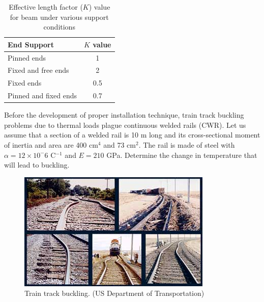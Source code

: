 \documentclass[
10pt,
a4paper,
openany,
svgnames,
]{book}
\begin{document}
\begin{table}[h]
  \centering
  \caption{Effective length factor ($K$) value for beam under various support conditions}
  {\renewcommand{\arraystretch}{1.2}
  \begin{tabular}{ lc }
    \toprule
    End Support & $K$ value \\
    \midrule
    Pinned ends & 1 \\
    Fixed and free ends & 2 \\
    Fixed ends & 0.5 \\
    Pinned and fixed ends & 0.7 \\
    \bottomrule
  \end{tabular}}
\end{table}

\begin{example}
  Before the development of proper installation technique, train track buckling problems due to thermal loads plague continuous welded rails (CWR). Let us assume that a section of a welded rail is 10 m long and its cross-sectional moment of inertia and area are 400 cm$^4$ and 73 cm$^2$. The rail is made of steel with $\alpha = 12 \times 10^-6$ C$^{-1}$ and $E = 210$ GPa. Determine the change in temperature that will lead to buckling.

  \begin{figure}[H]
    \centering
    \includegraphics[scale=0.7]{pictures/Failure-theories/Rail_buckle}
    \caption{Train track buckling. (US Department of Transportation)}
  \end{figure}
\end{example}
\end{document}
